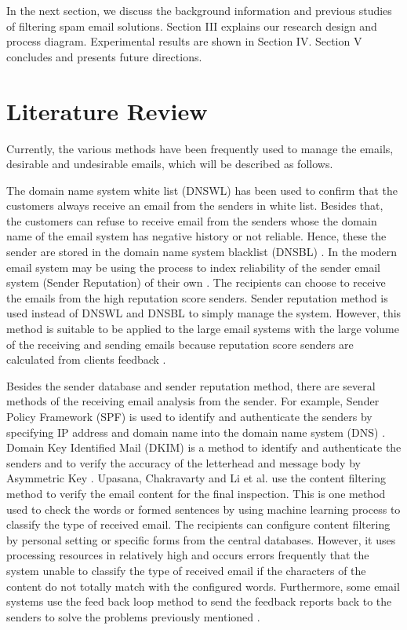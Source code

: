 \documentclass[conference]{IEEEtran}
\begin{document}
In the next section, we discuss the background information and previous studies of filtering spam email solutions. 
%
Section III explains our research design and process diagram. 
%
Experimental results are shown in Section IV.
%
Section V concludes and presents future directions.
%
\section{Literature Review}
Currently, the various methods \cite{levine, Sochor, Lazzari, DBLP:taylor, wong, NguyenTuanAnh, Seike, crocker, Leiba, Higashikado, upasana, XiaoJunyong, falk, FalkKucherawy, gmail} have been frequently used to manage the emails, desirable and undesirable emails, which will be described as follows.

The domain name system white list (DNSWL) \cite{levine} has been used to confirm that the customers always receive an email from the senders in white list.
%
Besides that, the customers can refuse to receive email from the senders whose the domain name of the email system has negative history or not reliable. 
%
Hence, these the sender are stored in the domain name system blacklist (DNSBL) \cite{levine,Sochor,Lazzari}.
%
In the modern email system may be using the process to index reliability of the sender email system (Sender Reputation) of their own \cite{DBLP:taylor}. 
%
The recipients can choose to receive the emails from the high reputation score senders.
%
Sender reputation method is used instead of DNSWL and DNSBL to simply manage the system.
%
However, this method is suitable to be applied to the large email systems with the large volume of the receiving and sending emails because reputation score senders are calculated from clients feedback .


Besides the sender database and sender reputation method, there are several methods of the receiving email analysis from the sender. 
%
For example, Sender Policy Framework (SPF) is used to identify and authenticate the senders by specifying IP address and domain name into the domain name system (DNS) \cite{wong,NguyenTuanAnh,Seike}.
%
Domain Key Identified Mail (DKIM) is a method to identify and authenticate the senders and to verify the accuracy of the letterhead and message body by Asymmetric Key \cite{crocker,Leiba,Higashikado}.
%
Upasana, Chakravarty \cite{upasana} and Li et al. \cite{XiaoJunyong} use the content filtering method to verify the email content for the final inspection.
% 
This is one method used to check the words or formed sentences by using machine learning process to classify the type of received email. 
%
The recipients can configure content filtering by personal setting or specific forms from the central databases.
%
However, it uses processing resources in relatively high and occurs errors frequently that the system unable to classify the type of received email if the characters of the content do not totally match with the configured words.
% 
Furthermore, some email systems use the feed back loop method to send the feedback reports back to the senders to solve the problems previously mentioned \cite{falk,FalkKucherawy}. 
\end{document}
